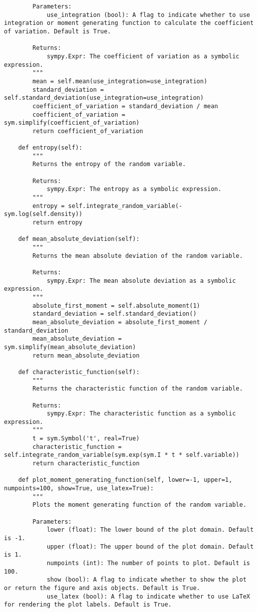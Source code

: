 \begin{small}
\begin{lstlisting}
        Parameters:
            use_integration (bool): A flag to indicate whether to use integration or moment generating function to calculate the coefficient of variation. Default is True.

        Returns:
            sympy.Expr: The coefficient of variation as a symbolic expression.
        """
        mean = self.mean(use_integration=use_integration)
        standard_deviation = self.standard_deviation(use_integration=use_integration)
        coefficient_of_variation = standard_deviation / mean
        coefficient_of_variation = sym.simplify(coefficient_of_variation)
        return coefficient_of_variation

    def entropy(self):
        """
        Returns the entropy of the random variable.

        Returns:
            sympy.Expr: The entropy as a symbolic expression.
        """
        entropy = self.integrate_random_variable(- sym.log(self.density))
        return entropy

    def mean_absolute_deviation(self):
        """
        Returns the mean absolute deviation of the random variable.

        Returns:
            sympy.Expr: The mean absolute deviation as a symbolic expression.
        """
        absolute_first_moment = self.absolute_moment(1)
        standard_deviation = self.standard_deviation()
        mean_absolute_deviation = absolute_first_moment / standard_deviation
        mean_absolute_deviation = sym.simplify(mean_absolute_deviation)
        return mean_absolute_deviation

    def characteristic_function(self):
        """
        Returns the characteristic function of the random variable.

        Returns:
            sympy.Expr: The characteristic function as a symbolic expression.
        """
        t = sym.Symbol('t', real=True)
        characteristic_function = self.integrate_random_variable(sym.exp(sym.I * t * self.variable))
        return characteristic_function

    def plot_moment_generating_function(self, lower=-1, upper=1, numpoints=100, show=True, use_latex=True):
        """
        Plots the moment generating function of the random variable.

        Parameters:
            lower (float): The lower bound of the plot domain. Default is -1.
            upper (float): The upper bound of the plot domain. Default is 1.
            numpoints (int): The number of points to plot. Default is 100.
            show (bool): A flag to indicate whether to show the plot or return the figure and axis objects. Default is True.
            use_latex (bool): A flag to indicate whether to use LaTeX for rendering the plot labels. Default is True.


\end{lstlisting}
\end{small}
